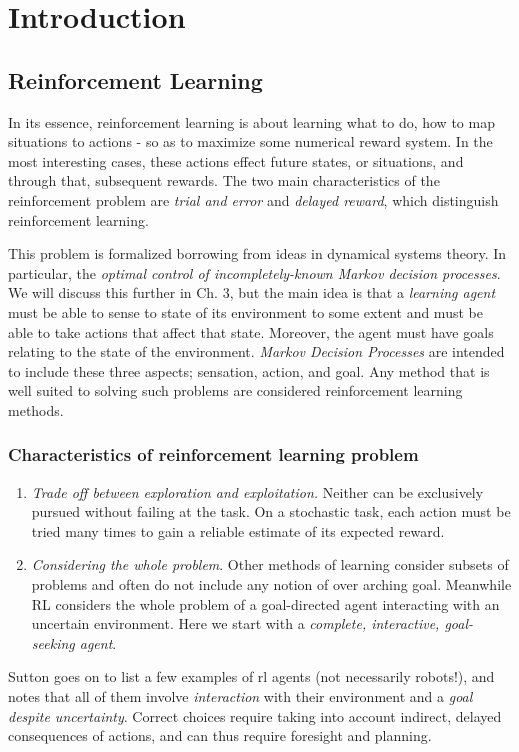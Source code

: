 \chapter
{Introduction}
\section{Reinforcement Learning}
In its essence, reinforcement learning is about learning what to do, how to map situations to actions - so as to maximize some numerical reward system. In the most interesting cases, these actions effect future states, or situations, and through that, subsequent rewards. The two main characteristics of the reinforcement problem are \textit{trial and error} and \textit{delayed reward}, which distinguish reinforcement learning.

This problem is formalized borrowing from ideas in dynamical systems theory. In particular, the \textit{optimal control of incompletely-known Markov decision processes}. We will discuss this further in Ch. 3, but the main idea is that a \textit{learning agent} must be able to sense to state of its environment to some extent and must be able to take actions that affect that state. Moreover, the agent must have goals relating to the state of the environment. \textit{Markov Decision Processes} are intended to include these three aspects; sensation, action, and goal. Any method that is well suited to solving such problems are considered reinforcement learning methods.
\subsection
{Characteristics of reinforcement learning problem}
\begin{enumerate}
    \item \textit{Trade off between exploration and exploitation.} Neither can be exclusively pursued without failing at the task. On a stochastic task, each action must be tried many times to gain a reliable estimate of its expected reward.
    \item \textit{Considering the whole problem}. Other methods of learning consider subsets of problems and often do not include any notion of over arching goal. Meanwhile RL considers the whole problem of a goal-directed agent interacting with an uncertain environment. Here we start with a \textit{complete, interactive, goal-seeking agent}.
\end{enumerate}
Sutton goes on to list a few examples of rl agents (not necessarily robots!), and notes that all of them involve \textit{interaction} with their environment and a \textit{goal despite uncertainty}. Correct choices require taking into account indirect, delayed consequences of actions, and can thus require foresight and planning.
